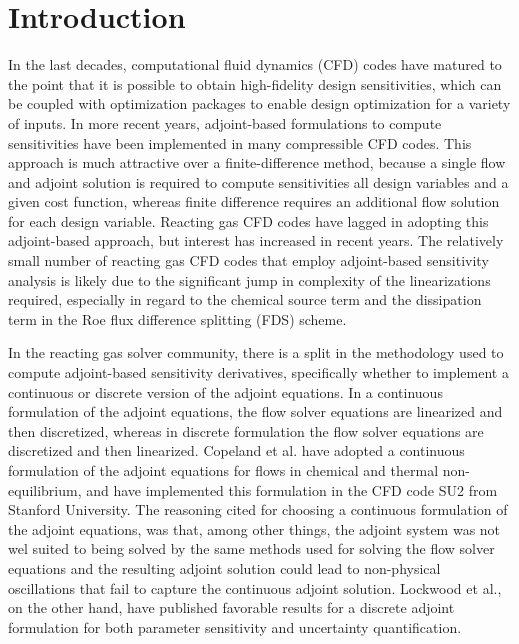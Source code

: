 \chapter{Introduction}
\label{chapter-one}

In the last decades, computational fluid dynamics (CFD) codes have matured to
the point that it is possible to obtain high-fidelity design sensitivities,
which can be coupled with optimization packages to enable design optimization
for a variety of inputs\cite{baysal1992aerodynamic, balagangadhar2001design}.
In more recent years, adjoint-based formulations to compute sensitivities have
been implemented in many compressible CFD codes\cite{mavriplis-2006,
nemec-aftosmis-adjoint, nielsen2002recent}. This approach is much attractive
over a finite-difference method, because a single flow and adjoint solution is
required to compute sensitivities all design variables and a given cost
function, whereas finite difference requires an additional flow solution for
each design variable.  Reacting gas CFD codes have lagged in adopting this
adjoint-based approach, but interest has increased in recent
years\cite{Copeland, Barcelona, lockwood2010parameter}.  The relatively small
number of reacting gas CFD codes that employ adjoint-based sensitivity analysis
is likely due to the significant jump in complexity of the linearizations
required, especially in regard to the chemical source term and the dissipation
term in the Roe flux difference splitting (FDS) scheme\cite{roe}.

In the reacting gas solver community, there is a split in the methodology used
to compute adjoint-based sensitivity derivatives, specifically whether to
implement a continuous or discrete version of the adjoint equations.  In a
continuous formulation of the adjoint equations, the flow solver equations are
linearized and then discretized, whereas in discrete formulation the flow solver
equations are discretized and then linearized.  Copeland et al.\cite{Copeland}
have adopted a continuous formulation of the adjoint equations for flows in
chemical and thermal non-equilibrium, and have implemented this formulation in
the CFD code SU2\cite{palacios2013stanford} from Stanford University.  The
reasoning cited for choosing a continuous formulation of the adjoint equations,
was that, among other things, the adjoint system was not wel suited to being
solved by the same methods used for solving the flow solver equations and the
resulting adjoint solution could lead to non-physical oscillations that fail to
capture the continuous adjoint solution.  Lockwood et
al.\cite{lockwood2010uncertainty, lockwood2010parameter}, on the other hand,
have published favorable results for a discrete adjoint formulation for both
parameter sensitivity and uncertainty quantification.


